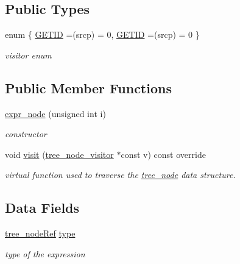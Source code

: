 \subsection*{Public Types}
\begin{DoxyCompactItemize}
\item 
enum \{ \hyperlink{structexpr__node_a7329dd4bd79d039282d90459c9993bcda7385ad18fe6eda5651301c4ce1de7f30}{G\+E\+T\+ID} =(srcp) = 0, 
\hyperlink{structexpr__node_a7329dd4bd79d039282d90459c9993bcda7385ad18fe6eda5651301c4ce1de7f30}{G\+E\+T\+ID} =(srcp) = 0
 \}\begin{DoxyCompactList}\small\item\em visitor enum \end{DoxyCompactList}
\end{DoxyCompactItemize}
\subsection*{Public Member Functions}
\begin{DoxyCompactItemize}
\item 
\hyperlink{structexpr__node_aa4e209b55521aae1a91bfbddeb627350}{expr\+\_\+node} (unsigned int i)
\begin{DoxyCompactList}\small\item\em constructor \end{DoxyCompactList}\item 
void \hyperlink{structexpr__node_aac767878f13ca07371dde2c3938ef38a}{visit} (\hyperlink{classtree__node__visitor}{tree\+\_\+node\+\_\+visitor} $\ast$const v) const override
\begin{DoxyCompactList}\small\item\em virtual function used to traverse the \hyperlink{classtree__node}{tree\+\_\+node} data structure. \end{DoxyCompactList}\end{DoxyCompactItemize}
\subsection*{Data Fields}
\begin{DoxyCompactItemize}
\item 
\hyperlink{tree__node_8hpp_a6ee377554d1c4871ad66a337eaa67fd5}{tree\+\_\+node\+Ref} \hyperlink{structexpr__node_a577cee1f950ec08ade2c3bde0554de12}{type}
\begin{DoxyCompactList}\small\item\em type of the expression \end{DoxyCompactList}\end{DoxyCompactItemize}
